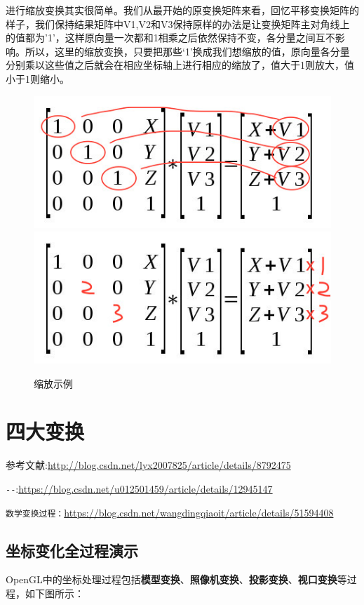 \documentclass[UTF8,a4paper,12pt]{ctexbook}
\begin{document}
		进行缩放变换其实很简单。我们从最开始的原变换矩阵来看，回忆平移变换矩阵的样子，我们保持结果矩阵中V1,V2和V3保持原样的办法是让变换矩阵主对角线上的值都为’1’，这样原向量一次都和1相乘之后依然保持不变，各分量之间互不影响。所以，这里的缩放变换，只要把那些‘1’换成我们想缩放的值，原向量各分量分别乘以这些值之后就会在相应坐标轴上进行相应的缩放了，值大于1则放大，值小于1则缩小。
		
		\begin{figure}[h]
			\centering
			\includegraphics[scale = 0.57]{scale_1.png}
			\includegraphics[scale = 0.57]{scale_2.png}
			\caption{缩放示例}
		\end{figure}

\chapter{四大变换}
参考文献:\url{http://blog.csdn.net/lyx2007825/article/details/8792475}

\verb|--|:\url{https://blog.csdn.net/u012501459/article/details/12945147}

\verb|数学变换过程：|\url{https://blog.csdn.net/wangdingqiaoit/article/details/51594408}

	\section{坐标变化全过程演示}
		OpenGL中的坐标处理过程包括\textbf{模型变换}、\textbf{照像机变换}、\textbf{投影变换}、\textbf{视口变换}等过程，如下图所示：
		
\end{document}
